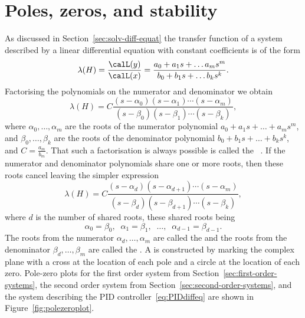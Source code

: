 \section{Poles, zeros, and stability}\label{sec:poles-zeros-stab}

As discussed in Section~\ref{sec:solv-diff-equat} the transfer function of a system described by a linear differential equation with constant coefficients is of the form
\[
\lambda(H) = \frac{\calL(y)}{\calL(x)} = \frac{a_0 + a_1s + \dots a_m s^m}{b_0 + b_1s + \dots b_k s^k}.
\]
Factorising the polynomials on the numerator and denominator we obtain
\[
\lambda(H) = C\frac{(s-\alpha_0)(s - \alpha_1)\cdots(s - \alpha_m)}{(s-\beta_0)(s - \beta_1)\cdots(s - \beta_k)},
\] 
where $\alpha_0, \dots, \alpha_m$ are the roots of the numerator polynomial $a_0 + a_1s + \dots + a_m s^m$, and $\beta_0, \dots, \beta_k$ are the roots of the denominator polynomial $b_0 + b_1s + \dots + b_k s^k$, and $C = \tfrac{a_m}{b_m}$.  That such a factorisation is always possible is called the ~\citep{Fine_fundamental_theorem_of_algebra}.  %
If the numerator and denominator polynomials share one or more roots, then these roots cancel leaving the simpler expression
\begin{equation}\label{eq:transfuncpoleszeros}
\lambda(H) = C\frac{(s-\alpha_d)(s - \alpha_{d+1})\cdots(s - \alpha_{m})}{(s-\beta_d)(s - \beta_{d+1})\cdots(s - \beta_{k})},
\end{equation}
where $d$ is the number of shared roots, these shared roots being 
\[
\alpha_0 = \beta_0, \;\; \alpha_1 = \beta_1, \;\; \dots, \;\;  \alpha_{d-1} = \beta_{d-1}.
\]
The roots from the numerator $\alpha_d, \dots, \alpha_m$ are called the  and the roots from the denominator $\beta_d, \dots, \beta_m$ are called the .  A  is constructed by marking the complex plane with a cross at the location of each pole and a circle at the location of each zero.  Pole-zero plots for the first order system from Section~\ref{sec:first-order-systems}, the second order system from Section~\ref{sec:second-order-systems}, and the system describing the PID controller~\eqref{eq:PIDdiffeq} are shown in Figure~\ref{fig:polezeroplot}.

